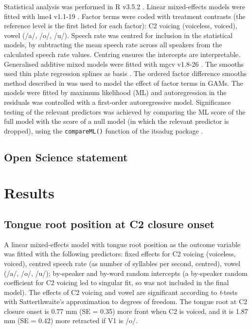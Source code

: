 \documentclass[12pt,]{article}
\begin{document}
Statistical analysis was performed in R v3.5.2 \citep{r-core-team2018}.
Linear mixed-effects models were fitted with lme4 v1.1-19
\citep{bates2015}. Factor terms were coded with treatment contrasts (the
reference level is the first listed for each factor): C2 voicing
(voiceless, voiced), vowel (/a/, /o/, /u/). Speech rate was centred for
inclusion in the statistical models, by subtracting the mean speech rate
across all speakers from the calculated speech rate values. Centring
ensures the intercepts are interpretable. Generalised additive mixed
models were fitted with mgcv v1.8-26 \citep{wood2011, wood2017}. The
smooths used thin plate regression splines as basis \citep{wood2003}.
The ordered factor difference smooths method described in
\citet{soskuthy2017, wieling2018} was used to model the effect of factor
terms in GAMs. The models were fitted by maximum likelihood (ML) and
autoregression in the residuals was controlled with a first-order
autoregressive model. Significance testing of the relevant predictors
was achieved by comparing the ML score of the full model with the score
of a null model (in which the relevant predictor is dropped), using the
\texttt{compareML()} function of the itsadug package
\citep{van-rij2017}.

\hypertarget{open-science-statement}{%
\subsection{Open Science statement}\label{open-science-statement}}

\hypertarget{results}{%
\section{Results}\label{results}}

\hypertarget{tongue-root-position-at-c2-closure-onset}{%
\subsection{Tongue root position at C2 closure
onset}\label{tongue-root-position-at-c2-closure-onset}}

A linear mixed-effects model with tongue root position as the outcome
variable was fitted with the following predictors: fixed effects for C2
voicing (voiceless, voiced), centred speech rate (as number of syllables
per second, centred), vowel (/a/, /o/, /u/); by-speaker and by-word
random intercepts (a by-speaker random coefficient for C2 voicing led to
singular fit, so was not included in the final model). The effects of C2
voicing and vowel are significant according to \emph{t}-tests with
Satterthwaite's approximation to degrees of freedom. The tongue root at
C2 closure onset is 0.77 mm (SE = 0.35) more front when C2 is voiced,
and it is 1.87 mm (SE = 0.42) more retracted if V1 is /o/.
\end{document}
